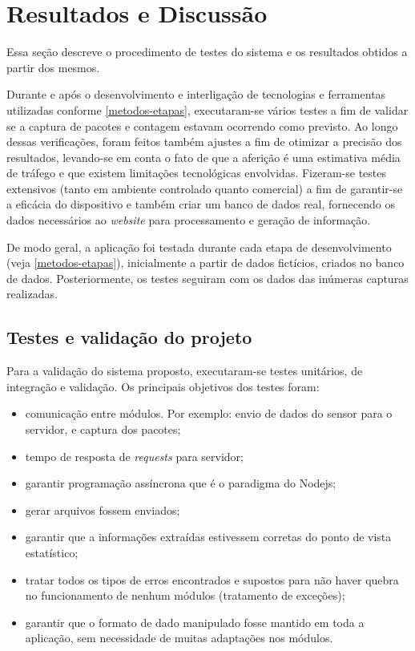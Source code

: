 \chapter{Resultados e Discussão}
\label{resultados-discussao}

Essa seção descreve o procedimento de testes do sistema e os resultados obtidos a partir dos mesmos.

Durante e após o desenvolvimento e interligação de tecnologias e ferramentas utilizadas conforme \autoref{metodos-etapas}, executaram-se vários testes a fim de validar se a captura de pacotes e contagem estavam ocorrendo como previsto. Ao longo dessas verificações, foram feitos também ajustes a fim de otimizar a precisão dos resultados, levando-se em conta o fato de que a aferição é uma estimativa média de tráfego e que existem limitações tecnológicas envolvidas. Fizeram-se testes extensivos (tanto em ambiente controlado quanto comercial) a fim de garantir-se a eficácia do dispositivo e também criar um banco de dados real, fornecendo os dados necessários ao \emph{website} para processamento e geração de informação.

De modo geral, a aplicação foi testada durante cada etapa de desenvolvimento (veja \autoref{metodos-etapas}), inicialmente a partir de dados fictícios, criados no banco de dados. Posteriormente, os testes seguiram com os dados das inúmeras capturas realizadas. 


\section{Testes e validação do projeto}

Para a validação do sistema proposto, executaram-se testes unitários, de integração e
validação. Os principais objetivos dos testes foram:

\begin{itemize}
  \item comunicação entre módulos. Por exemplo: envio de dados do sensor para o servidor, e captura dos pacotes;
  \item tempo de resposta de \emph{requests} para servidor;
  \item garantir programação assíncrona que é o paradigma do Nodejs;
  \item gerar arquivos fossem enviados;
  \item garantir que a informações extraídas estivessem corretas do ponto de vista estatístico;
  \item tratar todos os tipos de erros encontrados e supostos para não haver quebra no funcionamento
  de nenhum módulos (tratamento de exceções);
  \item garantir que o formato de dado manipulado fosse mantido em toda a aplicação, sem necessidade
  de muitas adaptações nos módulos.
\end{itemize}

